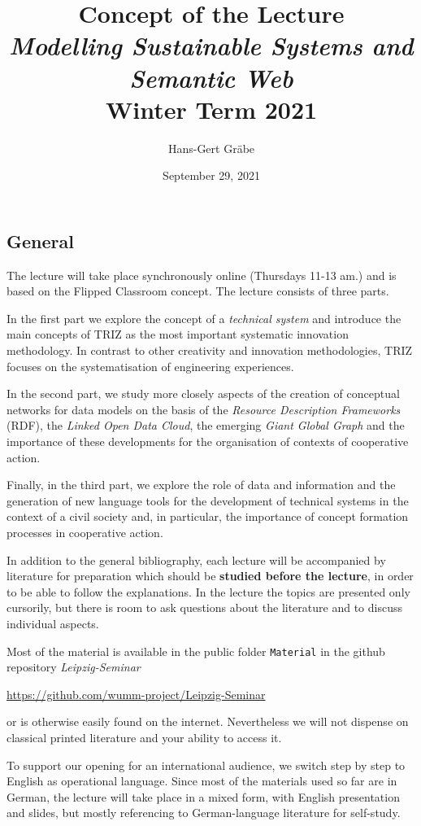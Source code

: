 \documentclass[11pt,a4paper]{article}
\title{Concept of the Lecture \\[1em] \emph{Modelling Sustainable Systems and
    Semantic Web} \\[1em] Winter Term 2021}
\author{Hans-Gert Gr\"abe}
\date{September 29, 2021}
\begin{document}
\maketitle

\subsection{General}

The lecture will take place synchronously online (Thursdays 11-13 am.) and is
based on the Flipped Classroom concept. The lecture consists of three parts.

In the first part we explore the concept of a \emph{technical system} and
introduce the main concepts of TRIZ as the most important systematic
innovation methodology.  In contrast to other creativity and innovation
methodologies, TRIZ focuses on the systematisation of engineering experiences.

In the second part, we study more closely aspects of the creation of
conceptual networks for data models on the basis of the \emph{Resource
  Description Frameworks} (RDF), the \emph{Linked Open Data Cloud}, the
emerging \emph{Giant Global Graph} and the importance of these developments
for the organisation of contexts of cooperative action.

Finally, in the third part, we explore the role of data and information and
the generation of new language tools for the development of technical systems
in the context of a civil society and, in particular, the importance of
concept formation processes in cooperative action.

In addition to the general bibliography, each lecture will be accompanied by
literature for preparation which should be \textbf{studied before the
  lecture}, in order to be able to follow the explanations. In the lecture the
topics are presented only cursorily, but there is room to ask questions about
the literature and to discuss individual aspects.

Most of the material is available in the public folder \texttt{Material} in
the github repository \emph{Leipzig-Seminar}
\begin{center}
  \url{https://github.com/wumm-project/Leipzig-Seminar}
\end{center}
or is otherwise easily found on the internet. Nevertheless we will not
dispense on classical printed literature and your ability to access it.

To support our opening for an international audience, we switch step by step
to English as operational language. Since most of the materials used so far
are in German, the lecture will take place in a mixed form, with English
presentation and slides, but mostly referencing to German-language literature
for self-study.
\end{document}
